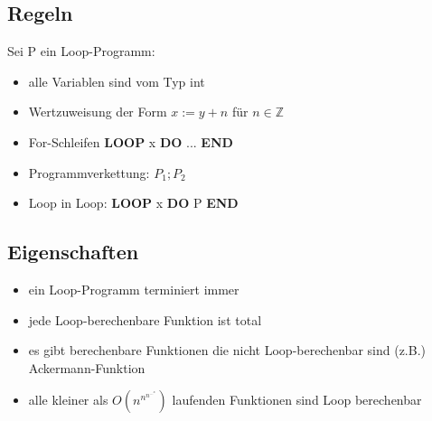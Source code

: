 \documentclass[12pt,a4paper]{article}
\begin{document}
\subsection{Regeln}
Sei P ein Loop-Programm:
\begin{itemize}
\item alle Variablen sind vom Typ int
\item Wertzuweisung der Form $x := y + n$ für $n\in \mathbb{Z}$
\item For-Schleifen \textbf{LOOP} x \textbf{DO} ... \textbf{END}
\item Programmverkettung: $P_1;P_2$
\item Loop in Loop: \textbf{LOOP} x \textbf{DO} P \textbf{END}
\end{itemize}


\subsection{Eigenschaften}
\begin{itemize}
\item ein Loop-Programm terminiert immer
\item jede Loop-berechenbare Funktion ist total
\item es gibt berechenbare Funktionen die nicht Loop-berechenbar sind (z.B.) Ackermann-Funktion
\item alle kleiner als $O(n^{n^{n^{...^{x}}}})$ laufenden Funktionen sind Loop berechenbar
\end{itemize}
\end{document}
